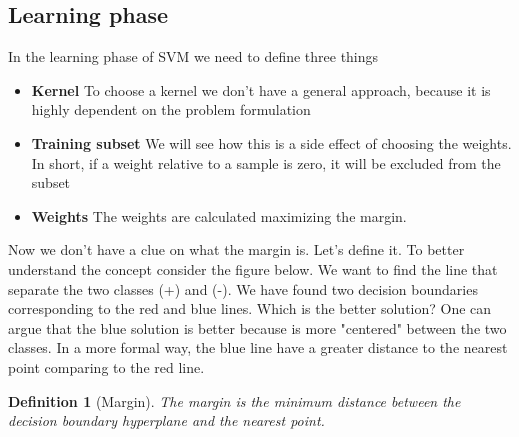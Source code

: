 \documentclass[main.tex]{subfiles}
\newtheorem{definition}{Definition}[section]
\begin{document}
\subsection{Learning phase}
In the learning phase of SVM we need to define three things
\begin{itemize}
    \item \textbf{Kernel} To choose a kernel we don't have a general approach, because it is highly dependent on the problem formulation
    \item \textbf{Training subset} We will see how this is a side effect of choosing the weights. In short, if a weight relative to a sample is zero, it will be excluded from the subset
    \item \textbf{Weights} The weights are calculated maximizing the margin. 
\end{itemize}
Now we don't have a clue on what the margin is. Let's define it.
To better understand the concept consider the figure below. We want to find the line that separate the two classes (+) and (-). We have found two decision boundaries corresponding to the red and blue lines. Which is the better solution? One can argue that the blue solution is better because is more "centered" between the two classes. In a more formal way, the blue line have a greater distance to the nearest point comparing to the red line. 
\begin{definition}[Margin]
The margin is the minimum distance between the decision boundary hyperplane and the nearest point.
\end{definition}
\end{document}
